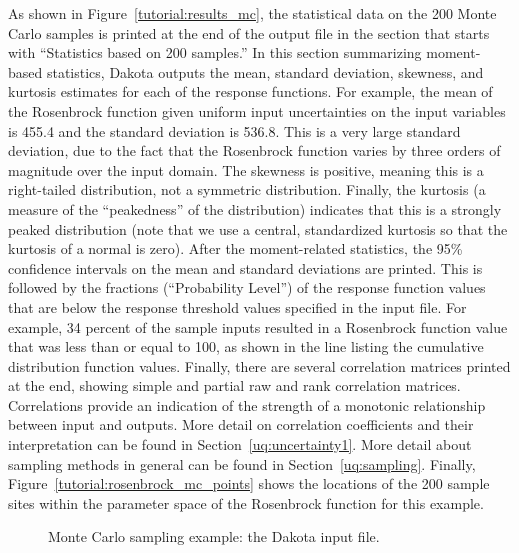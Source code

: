 As shown in Figure~\ref{tutorial:results_mc}, 
the statistical data on the 200 Monte Carlo samples is printed at the
end of the output file in the section that starts with ``Statistics
based on 200 samples.'' In this section summarizing 
moment-based statistics, Dakota outputs the
mean, standard deviation, skewness, and kurtosis estimates 
for each of the response functions. For example, 
the mean of the Rosenbrock function given uniform input uncertainties 
on the input variables is 455.4 and the standard deviation is 536.8. 
This is a very large standard deviation, due to the fact that the 
Rosenbrock function varies by three orders of magnitude over the input 
domain. The skewness is positive, meaning this is a right-tailed distribution, 
not a symmetric distribution. Finally, the kurtosis (a measure of the 
``peakedness'' of the distribution) indicates that 
this is a strongly peaked distribution (note that we use a central, 
standardized kurtosis so that the kurtosis of a normal is zero). 
After the moment-related statistics, the 95\% confidence intervals on the 
mean and standard deviations are printed. This is followed by
the fractions (``Probability Level'') of the response function values 
that are below the response threshold values specified in the input file. 
For example, 34 percent of the sample inputs resulted in a Rosenbrock 
function value that was less than or equal to 100, as shown in the line 
listing the cumulative distribution function values. 
Finally, there are several 
correlation matrices printed at the end, showing simple and partial 
raw and rank correlation matrices. Correlations provide an indication 
of the strength of a monotonic relationship between input and outputs. 
More detail on correlation coefficients and their interpretation can be 
found in Section~\ref{uq:uncertainty1}. 
More detail about sampling methods in general can be found in 
Section~\ref{uq:sampling}. Finally,  
Figure~\ref{tutorial:rosenbrock_mc_points} shows the locations
of the 200 sample sites within the parameter space of the Rosenbrock
function for this example.

\begin{figure}[ht!]
  \centering
  \begin{bigbox}
    \begin{small}
    \end{small}
  \end{bigbox}
  \caption{Monte Carlo sampling example: the Dakota input file.}
  \label{tutorial:rosenbrock_mc}
\end{figure}

